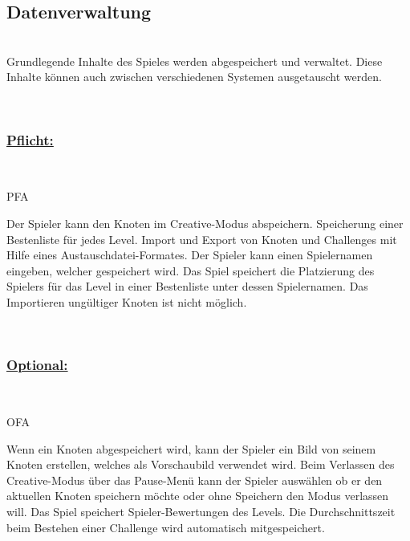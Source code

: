 %
%


\subsection{Datenverwaltung}

%
%
\renewcommand{\K}{}
%
%

~\\
Grundlegende Inhalte des Spieles werden abgespeichert und verwaltet.
Diese Inhalte können auch zwischen verschiedenen Systemen ausgetauscht werden.

\\

%
%
\subsubsection*{\underline{Pflicht:}}~\\

\begin{ids}{\gls{PFA\K}}

	\id[ 390] Der Spieler kann den Knoten im Creative-Modus abspeichern.
	\id[ 400]Speicherung einer Bestenliste für jedes Level.
	\id[ 410] Import und Export von Knoten und Challenges mit Hilfe eines Austauschdatei-Formates.
	\id[ 420] Der Spieler kann einen Spielernamen eingeben, welcher gespeichert wird.
	\id[ 430] Das Spiel speichert die Platzierung des Spielers  für das Level in einer Bestenliste unter dessen Spielernamen.
	\id[ 440] Das Importieren ungültiger Knoten ist nicht möglich.
	
 	
 	
	
\end{ids}

~\\


%
%
\subsubsection*{\underline{Optional:}}~\\


\begin{ids}{\gls{OFA\K}}

	\id[ 450] Wenn ein Knoten abgespeichert wird, kann der Spieler ein Bild von seinem Knoten erstellen, welches als Vorschaubild verwendet wird.
	\id[ 460] Beim Verlassen des Creative-Modus über das Pause-Menü  kann der Spieler auswählen ob er den aktuellen Knoten speichern möchte oder ohne Speichern den Modus verlassen will.
	\id[ 470] Das Spiel speichert Spieler-Bewertungen des Levels.
	\id[ 480] Die Durchschnittszeit beim Bestehen einer Challenge wird automatisch mitgespeichert.
	
 	
 	
	
\end{ids}

~\\